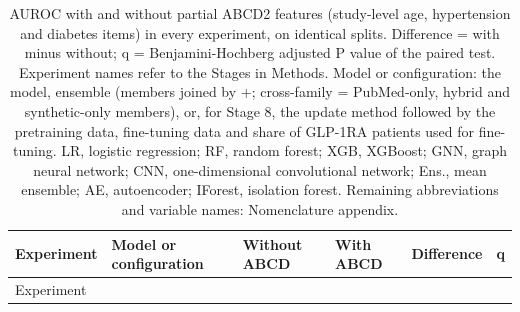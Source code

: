 \documentclass[journal]{IEEEtran}
\begin{document}
{\scriptsize
\begin{longtable}[]{@{}
  >{\raggedright\arraybackslash}p{}
  >{\raggedright\arraybackslash}p{}
  >{\raggedright\arraybackslash}p{}
  >{\raggedright\arraybackslash}p{}
  >{\raggedright\arraybackslash}p{}
  >{\raggedright\arraybackslash}p{}@{}}
\caption{AUROC with and without partial ABCD2 features (study-level age,
hypertension and diabetes items) in every experiment, on identical
splits. Difference = with minus without; q = Benjamini-Hochberg adjusted
P value of the paired test. Experiment names refer to the Stages in
Methods. Model or configuration: the model, ensemble (members joined by
+; cross-family = PubMed-only, hybrid and synthetic-only members), or,
for Stage 8, the update method followed by the pretraining data,
fine-tuning data and share of GLP-1RA patients used for fine-tuning. LR,
logistic regression; RF, random forest; XGB, XGBoost; GNN, graph neural
network; CNN, one-dimensional convolutional network; Ens., mean
ensemble; AE, autoencoder; IForest, isolation forest. Remaining
abbreviations and variable names: Nomenclature appendix.}\tabularnewline
\toprule\noalign{}
\begin{minipage}[b]{\linewidth}\raggedright
Experiment
\end{minipage} & \begin{minipage}[b]{\linewidth}\raggedright
Model or configuration
\end{minipage} & \begin{minipage}[b]{\linewidth}\raggedright
Without ABCD
\end{minipage} & \begin{minipage}[b]{\linewidth}\raggedright
With ABCD
\end{minipage} & \begin{minipage}[b]{\linewidth}\raggedright
Difference
\end{minipage} & \begin{minipage}[b]{\linewidth}\raggedright
q
\end{minipage} \\
\midrule\noalign{}
\endfirsthead
\toprule\noalign{}
\begin{minipage}[b]{\linewidth}\raggedright
Experiment
\end{minipage} & \begin{minipage}[b]{\linewidth}\raggedright

\end{minipage}
\end{longtable}}
\end{document}
